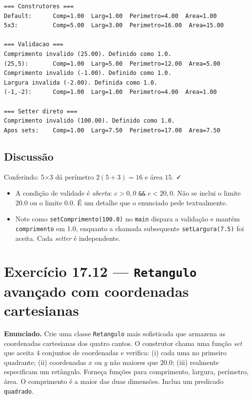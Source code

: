 \documentclass[11pt,a4paper]{article}
\begin{document}
\begin{saidabox}
\begin{lstlisting}[style=terminal]
=== Construtores ===
Default:      Comp=1.00  Larg=1.00  Perimetro=4.00  Area=1.00
5x3:          Comp=5.00  Larg=3.00  Perimetro=16.00  Area=15.00

=== Validacao ===
Comprimento invalido (25.00). Definido como 1.0.
(25,5):       Comp=1.00  Larg=5.00  Perimetro=12.00  Area=5.00
Comprimento invalido (-1.00). Definido como 1.0.
Largura invalida (-2.00). Definida como 1.0.
(-1,-2):      Comp=1.00  Larg=1.00  Perimetro=4.00  Area=1.00

=== Setter direto ===
Comprimento invalido (100.00). Definido como 1.0.
Apos sets:    Comp=1.00  Larg=7.50  Perimetro=17.00  Area=7.50
\end{lstlisting}
\end{saidabox}

\subsection*{Discuss\~ao}

Conferindo: 5$\times$3 d\'a per\'imetro $2(5+3) = 16$ e \'area $15$. ✓

\begin{itemize}[leftmargin=*]
  \item A condi\c{c}\~ao de validade \'e \emph{aberta}: $c > 0{,}0$ \texttt{\&\&} $c < 20{,}0$. N\~ao se inclui o limite 20.0 ou o limite 0.0. \'E um detalhe que o enunciado pede textualmente.
  \item Note como \texttt{setComprimento(100.0)} no \texttt{main} dispara a valida\c{c}\~ao e mant\'em \texttt{comprimento} em 1.0, enquanto a chamada subsequente \texttt{setLargura(7.5)} foi aceita. Cada \emph{setter} \'e independente.
\end{itemize}

\newpage
\section{Exerc\'icio 17.12 --- \texttt{Retangulo} avan\c{c}ado com coordenadas cartesianas}

\begin{enunciado}
\textbf{Enunciado.} Crie uma classe \texttt{Retangulo} mais sofisticada que armazena as coordenadas cartesianas dos quatro cantos. O construtor chama uma fun\c{c}\~ao \emph{set} que aceita 4 conjuntos de coordenadas e verifica: (i) cada uma no primeiro quadrante; (ii) coordenadas $x$ ou $y$ n\~ao maiores que 20.0; (iii) realmente especificam um ret\^angulo. Forne\c{c}a fun\c{c}\~oes para comprimento, largura, per\'imetro, \'area. O comprimento \'e a maior das duas dimens\~oes. Inclua um predicado \texttt{quadrado}.
\end{enunciado}
\end{document}
